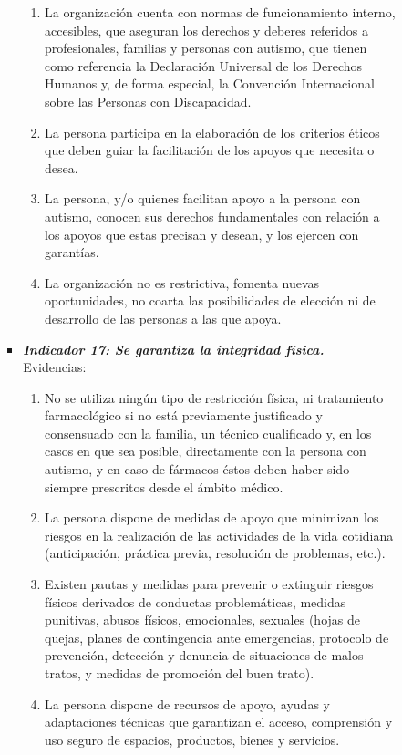 \begin{itemize}
\begin{itemize}
\begin{itemize}
\begin{itemize}
				\begin{enumerate}
					\item La organización cuenta con normas de funcionamiento interno, accesibles, que aseguran los derechos y deberes referidos a profesionales, familias y personas con autismo, que tienen como referencia la Declaración Universal de los Derechos Humanos y, de forma especial, la Convención Internacional sobre las Personas con Discapacidad. 
					\item La persona participa en la elaboración de los criterios éticos que deben guiar la facilitación de los apoyos que necesita o desea. 
					\item La persona, y/o quienes facilitan apoyo a la persona con autismo, conocen sus derechos fundamentales con relación a los apoyos que estas precisan y desean, y los ejercen con garantías. 
					\item La organización no es restrictiva, fomenta nuevas oportunidades, no coarta las posibilidades de elección ni de desarrollo de las personas a las que apoya. 
				\end{enumerate}
				\item \textbf{\textit{Indicador 17: Se garantiza la integridad física.}}\\Evidencias:
				
				\begin{enumerate}
					\item No se utiliza ningún tipo de restricción física, ni tratamiento farmacológico si no está previamente justificado y consensuado con la familia, un técnico cualificado y, en los casos en que sea posible, directamente con la persona con autismo, y en caso de fármacos éstos deben haber sido siempre prescritos desde el ámbito médico. 
					\item La persona dispone de medidas de apoyo que minimizan los riesgos en la realización de las actividades de la vida cotidiana (anticipación, práctica previa, resolución de problemas, etc.). 
					\item Existen pautas y medidas para prevenir o extinguir riesgos físicos derivados de conductas problemáticas, medidas punitivas, abusos físicos, emocionales, sexuales (hojas de quejas, planes de contingencia ante emergencias, protocolo de prevención, detección y denuncia de situaciones de malos tratos, y medidas de promoción del buen trato). 
					\item La persona dispone de recursos de apoyo, ayudas y adaptaciones técnicas que garantizan el acceso, comprensión y uso seguro de espacios, productos, bienes y servicios. 
					

\end{enumerate}
\end{itemize}
\end{itemize}
\end{itemize}
\end{itemize}
